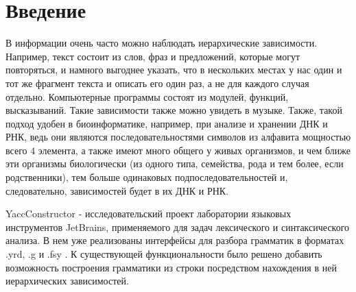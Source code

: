 \documentclass[14pt]{matmex-diploma}
\begin{document}

\maketitle
\tableofcontents
\section*{Введение}
    В информации очень часто можно наблюдать иерархические зависимости. Например, текст состоит из слов, фраз и предложений, которые могут повторяться, и намного выгоднее указать, что в нескольких местах у нас один и тот же фрагмент текста и описать его один раз, а не для каждого случая отдельно. Компьютерные программы состоят из модулей, функций, высказываний. Такие зависимости также можно увидеть в музыке. Также,  такой подход удобен в биоинформатике, например, при анализе и хранении ДНК и РНК, ведь они являются последовательностями символов из алфавита мощностью всего 4 элемента, а также имеют много общего у живых организмов, и чем ближе эти организмы биологически (из одного типа, семейства, рода и тем более, если родственники), тем больше одинаковых подпоследовательностей и, следовательно, зависимостей будет в их ДНК и РНК.
     
     YaccConstructor \cite{YaccConstructorPage} - исследовательский проект лаборатории языковых инструментов JetBrains, применяемого для задач лексического и синтаксического анализа. В нем уже реализованы интерфейсы для разбора грамматик в форматах .yrd, .g и .fsy . К существующей функциональности было решено добавить возможность построения грамматики из строки посредством нахождения в ней иерархических зависимостей. 
\end{document}
